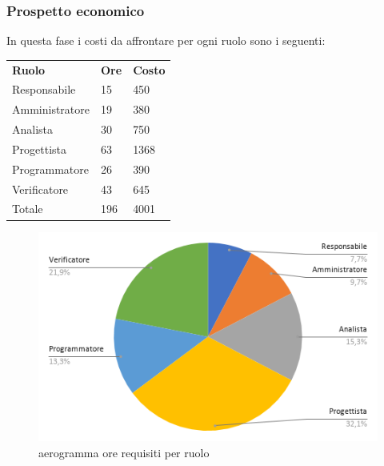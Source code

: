     \subsubsection{Prospetto economico}
    In questa fase i costi da affrontare per ogni ruolo sono i seguenti:
        \begin{center}
            \begin{table}[ht!]
                \centering
                \renewcommand{\arraystretch}{1.8}
                \begin{tabular}{p{75px} p{20px} p{30px}}
                    \rowcolor{logo!70} \textbf{Ruolo} & \textbf{Ore} & \textbf{Costo}\\
                    Responsabile & 15 & 450 \\
                    Amministratore & 19 & 380 \\
                    Analista & 30 & 750 \\
                    Progettista & 63 & 1368 \\
                    Programmatore & 26 & 390 \\
                    Verificatore & 43 & 645  \\
                    Totale & 196 & 4001 \\
                \end{tabular}
            \end{table}
        \end{center}
        \pagebreak

        \begin{figure}[!h]
            \caption{aerogramma ore requisiti per ruolo}
            \vspace{5px}
            \includegraphics[scale=0.5]{../../../Images/Diagrammi/Diagramma a torta/ore architettura.png}
            \centering
        \end{figure}


